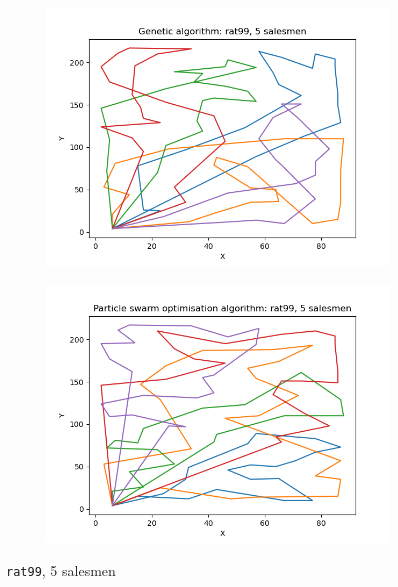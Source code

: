 \documentclass[conference]{IEEEtran}
\begin{document}
\begin{figure}[h]
    \centering
    \begin{subfigure}{.5\textwidth}
      \centering
      \includegraphics[width=\textwidth]{images/Genetic algorithm: rat99, 5 salesmen.png}
    \end{subfigure}%
    \begin{subfigure}{.5\textwidth}
      \centering
      \includegraphics[width=\textwidth]{images/Particle swarm optimisation algorithm: rat99, 5 salesmen.png}
    \end{subfigure}%
    \caption{\texttt{rat99}, 5 salesmen} \label{rat99, 5 salesmen}
\end{figure}
\end{document}
